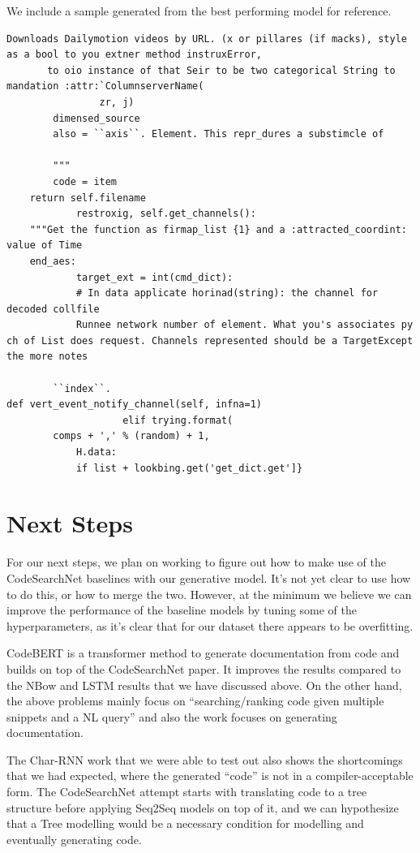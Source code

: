\documentclass{article}
\begin{document}
We include a sample generated from the best performing model for reference.
\begin{verbatim}
Downloads Dailymotion videos by URL. (x or pillares (if macks), style as a bool to you extner method instruxError,
       to oio instance of that Seir to be two categorical String to mandation :attr:`ColumnserverName(
                zr, j)
        dimensed_source
        also = ``axis``. Element. This repr_dures a substimcle of

        """
        code = item
    return self.filename
            restroxig, self.get_channels():
    """Get the function as firmap_list {1} and a :attracted_coordint: value of Time
    end_aes:
            target_ext = int(cmd_dict):
            # In data applicate horinad(string): the channel for decoded collfile
            Runnee network number of element. What you's associates py ch of List does request. Channels represented should be a TargetExcept the more notes

        ``index``.
def vert_event_notify_channel(self, infna=1)
                    elif trying.format(
        comps + ',' % (random) + 1,
            H.data:
            if list + lookbing.get('get_dict.get']}
\end{verbatim}

\section{Next Steps}
For our next steps, we plan on working to figure out how to make use of the CodeSearchNet baselines with our generative model. It's not yet clear to use how to do this, or how to merge the two. However, at the minimum we believe we can improve the performance of the baseline models by tuning some of the hyperparameters, as it's clear that for our dataset there appears to be overfitting. 

CodeBERT \cite{codebert} is a transformer method to generate documentation from code and builds on top of the CodeSearchNet paper. It improves the results compared to the NBow and LSTM results that we have discussed above. On the other hand, the above problems mainly focus on “searching/ranking code given multiple snippets and a NL query” and also the work focuses on generating documentation.

The Char-RNN work that we were able to test out also shows the shortcomings that we had expected, where the generated “code” is not in a compiler-acceptable form. The CodeSearchNet attempt starts with translating code to a tree structure before applying Seq2Seq models on top of it, and we can hypothesize that a Tree modelling would be a necessary condition for modelling and eventually generating code.
\end{document}
